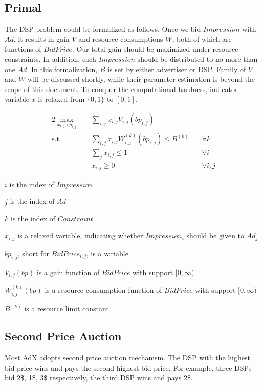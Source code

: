 \documentclass[sigconf]{acmart}
\newcommand{\sumj}{\sum\limits_j}
\newcommand{\sumij}{\sum\limits_{i,j}}
\newcommand{\sx}{x_{i,j}}
\newcommand{\sbp}{bp_{i,j}}
\newcommand{\sV}{V_{i,j}}
\newcommand{\sW}{W_{i,j}^{(k)}}
\newcommand{\sB}{B^{(k)}}
\newcommand{\dspresourceconstraint}{\sumij \sx \sW(\sbp) \le \sB}
\newcommand{\assignmentconstraint}{\sumj \sx \le 1}
\begin{document}
\subsection{Primal}

The DSP problem could be formalized as follows.
Once we bid $Impression$ with $Ad$, it results in gain $V$ and resource consumptions $W$, both of which are functions of $BidPrice$.
Our total gain should be maximized under resource constraints.
In addition, each $Impression$ should be distributed to no more than one $Ad$.
In this formalization, $B$ is set by either advertiser or DSP.
Family of $V$ and $W$ will be discussed shortly, while their parameter estimation is beyond the scope of this document.
To conquer the computational hardness, indicator variable $x$ is relaxed from $\{0, 1\}$ to $[0, 1]$.

\begin{alignat}{2}
    \max\limits_{\sx, \sbp} \quad & \sumij \sx \sV(\sbp) \quad    & {} \\
    \mbox{s.t.} \quad             & \dspresourceconstraint \quad  & \forall k \\
    \quad                         & \assignmentconstraint \quad   & \forall i \\
    \quad                         & \sx \ge 0 \quad               & \forall i,j
\end{alignat}

$i$ is the index of $Impression$

$j$ is the index of $Ad$

$k$ is the index of $Constraint$

$\sx$ is a relaxed variable, indicating whether $Impression_i$ should be given to $Ad_j$

$\sbp$, short for $BidPrice_{i,j}$, is a variable

$\sV(bp)$ is a gain function of $BidPrice$ with support $[0, \infty)$

$\sW(bp)$ is a resource consumption function of $BidPrice$ with support $[0, \infty)$

$\sB$ is a resource limit constant

\subsection{Second Price Auction}

Most AdX adopts second price auction mechanism.
The DSP with the highest bid price wins and pays the second highest bid price.
For example, three DSPs bid 2\$, 1\$, 3\$ respectively, the third DSP wins and pays 2\$. 
\end{document}
